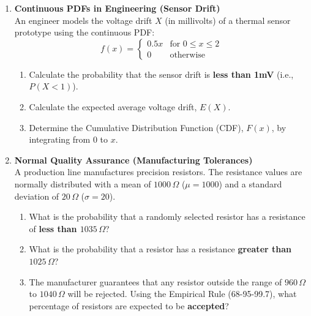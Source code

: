 \begin{enumerate}[label=\textbf{Q\arabic*.}, leftmargin=*, start=4]

    \item \textbf{Continuous PDFs in Engineering (Sensor Drift)} \\
    An engineer models the voltage drift $X$ (in millivolts) of a thermal sensor prototype using the continuous PDF:
    $$
    f(x) = \begin{cases} 
    0.5x & \text{for } 0 \leq x \leq 2 \\ 
    0 & \text{otherwise} 
    \end{cases}
    $$
    \begin{enumerate}[label=\arabic*.]
        \item Calculate the probability that the sensor drift is \textbf{less than 1mV} (i.e., $P(X < 1)$).
        \item Calculate the expected average voltage drift, $E(X)$.
        \item Determine the Cumulative Distribution Function (CDF), $F(x)$, by integrating from $0$ to $x$.
    \end{enumerate}
    \vspace{0.3cm}

    \item \textbf{Normal Quality Assurance (Manufacturing Tolerances)} \\
    A production line manufactures precision resistors. The resistance values are normally distributed with a mean of $1000\,\Omega$ ($\mu = 1000$) and a standard deviation of $20\,\Omega$ ($\sigma = 20$).
    \begin{enumerate}[label=\arabic*.]
        \item What is the probability that a randomly selected resistor has a resistance of \textbf{less than $1035\,\Omega$}?
        \item What is the probability that a resistor has a resistance \textbf{greater than $1025\,\Omega$}?
        \item The manufacturer guarantees that any resistor outside the range of $960\,\Omega$ to $1040\,\Omega$ will be rejected. Using the Empirical Rule (68-95-99.7), what percentage of resistors are expected to be \textbf{accepted}?
    \end{enumerate}
    \vspace{0.3cm}


\end{enumerate}

